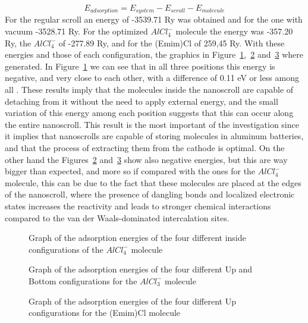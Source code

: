 \documentclass[aps,twocolumn,secnumarabic,nobalancelastpage,amsmath,amssymb,
nofootinbib,floatfix]{revtex4}
\begin{document}
\begin{equation}E_{adsorption}=E_{system}-E_{scroll}-E_{molecule}\end{equation}
For the regular scroll an energy of -3539.71 Ry was obtained and for the one with vacuum -3528.71 Ry. For the optimized \(AlCl_{4}^{-}\) molecule the energy was -357.20 Ry, the \(AlCl_{4}^{-}\) of -277.89 Ry, and for the (Emim)Cl of 259,45 Ry. With these energies and those of each configuration, the graphics in Figure~\ref{3},~\ref{4} and~\ref{5} where generated. In Figure~\ref{3} we can see that in all three positions this energy is negative, and very close to each other, with a difference of 0.11 eV or less among all . These results imply that the molecules inside the nanoscroll are capable of detaching from it without the need to apply external energy, and the small variation of this energy among each position suggests that this can occur along the entire nanoscroll. This result is the most important of the investigation since it implies that nanoscrolls are capable of storing molecules in aluminum batteries, and that the process of extracting them from the cathode is optimal. On the other hand the Figures~\ref{4} and~\ref{5} show also negative energies, but this are way bigger than expected, and more so if compared with the ones for the \(AlCl_{4}^{-}\) molecule, this can be due to the fact that these molecules are placed at the edges of the nanoscroll, where the presence of dangling bonds and localized electronic states increases the reactivity and leads to stronger chemical interactions compared to the van der Waals-dominated intercalation sites.
\caption{Graph of the adsorption energies of the three different inside configurations of the \(AlCl_{4}^{-}\) molecule}
\begin{figure}[htbp]
\centering
\caption{Graph of the adsorption energies of the four different inside configurations of the \(AlCl_{4}^{-}\) molecule}
\label{3}
\end{figure}

\begin{figure}[htbp]
\centering
\caption{Graph of the adsorption energies of the four different Up and Bottom configurations for the \(AlCl_{3}^{-}\) molecule}
\label{4}
\end{figure}

\begin{figure}[htbp]
\centering
\caption{Graph of the adsorption energies of the four different Up configurations for the (Emim)Cl molecule}
\label{5}
\end{figure}
\end{document}
